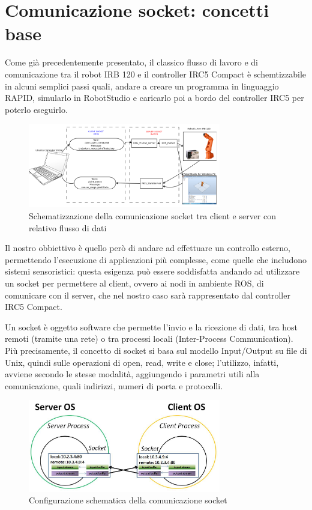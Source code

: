 \section{Comunicazione socket: concetti base}
Come già precedentemente presentato, il classico flusso di lavoro e di comunicazione tra il robot IRB 120 e il controller IRC5 Compact è schemtizzabile in alcuni semplici passi quali, andare a creare un programma in linguaggio RAPID, simularlo in RobotStudio e caricarlo poi a bordo del controller IRC5 per poterlo eseguirlo.
\begin{figure}[h]
	\centering
	\includegraphics[width=0.75\textwidth]{Immagini/Socket_Comm}
	\caption{Schematizzazione della comunicazione socket tra client e server con relativo flusso di dati}
	\label{fig:SocketStructure}
\end{figure}
Il nostro obbiettivo è quello però di andare ad effettuare un controllo esterno, permettendo l'esecuzione di applicazioni più complesse, come quelle che includono sistemi sensoristici: questa esigenza può essere soddisfatta andando ad utilizzare un socket per permettere al client, ovvero ai nodi in ambiente ROS, di comunicare con il server, che nel nostro caso sarà rappresentato dal controller IRC5 Compact.

Un socket è oggetto software che permette l’invio e la ricezione di dati, tra host remoti (tramite una rete) o tra processi locali (Inter-Process Communication).
Più precisamente, il concetto di socket si basa sul modello Input/Output su file di Unix, quindi sulle operazioni di open, read, write e close; l’utilizzo, infatti, avviene secondo le stesse modalità, aggiungendo i parametri utili alla comunicazione, quali indirizzi, numeri di porta e protocolli.
\begin{figure}[h]
	\centering
	\includegraphics[width=0.75\textwidth]{Immagini/Basic_SocketConfig}
	\caption{Configurazione schematica della comunicazione socket}
	\label{fig:BasicSocketConfig}
\end{figure}

